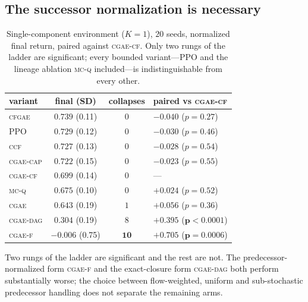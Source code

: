 \documentclass[review,authoryear,3p,times]{elsarticle}
\newcommand{\cgae}{\textsc{cgae}}              %
\newcommand{\cflow}{\textsc{cgae-cf}}          %
\newcommand{\cflowraw}{\textsc{cgae-f}}        %
\newcommand{\cdag}{\textsc{cgae-dag}}          %
\newcommand{\ccap}{\textsc{cgae-cap}}          %
\newcommand{\ccf}{\textsc{ccf}}
\newcommand{\mcq}{\textsc{mc-q}}
\newcommand{\cfgae}{\textsc{cfgae}}
\begin{document}
\subsection{The successor normalization is necessary}
\label{sec:normneeded}

\begin{table}[tbp]
\centering
\caption{Single-component environment ($K{=}1$), $20$ seeds, normalized final
return, paired against \cflow. Only two rungs of the ladder are significant;
every bounded variant---PPO and the lineage ablation \mcq{} included---is
indistinguishable from every other.}
\label{tab:ablation}
\begin{tabular}{lccl}
\toprule
variant & final (SD) & collapses & paired vs \cflow \\
\midrule
\cfgae     & $0.739$ {\tiny(0.11)} & $0$ & $-0.040$ ($p=0.27$) \\
PPO        & $0.729$ {\tiny(0.12)} & $0$ & $-0.030$ ($p=0.46$) \\
\ccf       & $0.727$ {\tiny(0.13)} & $0$ & $-0.028$ ($p=0.54$) \\
\ccap      & $0.722$ {\tiny(0.15)} & $0$ & $-0.023$ ($p=0.55$) \\
\cflow     & $0.699$ {\tiny(0.14)} & $0$ & --- \\
\mcq       & $0.675$ {\tiny(0.10)} & $0$ & $+0.024$ ($p=0.52$) \\
\cgae      & $0.643$ {\tiny(0.19)} & $1$ & $+0.056$ ($p=0.36$) \\
\cdag      & $0.304$ {\tiny(0.19)} & $8$ & $\mathbf{+0.395}$ ($\mathbf{p<0.0001}$) \\
\cflowraw  & $-0.006$ {\tiny(0.75)} & $\mathbf{10}$ & $\mathbf{+0.705}$ ($\mathbf{p=0.0006}$) \\
\bottomrule
\end{tabular}
\end{table}

Two rungs of the ladder are significant and the rest are not. The
predecessor-normalized form \cflowraw{} and the exact-closure form \cdag{} both
perform substantially worse; the choice between flow-weighted, uniform and
sub-stochastic predecessor handling does not separate the remaining arms.
\end{document}
